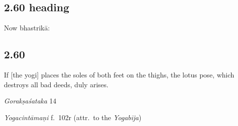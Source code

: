 \begin{ekdosis}
\subsection*{2.60 heading}
\begin{translation}[hp02_060a]
Now bhastrikā:
\end{translation}


\subsection*{2.60}
\begin{translation}[hp02_060]
If [the yogi] places the soles of both feet on the thighs, the lotus pose, which destroys all bad deeds, duly arises.
\end{translation}

\begin{sources}[hp02_060]
\emph{Gorakṣaśataka} 14

\begin{versinnote}
\end{versinnote}
\end{sources}

\begin{testimonia}[hp02_060]

\emph{Yogacintāmaṇi} f.~102r (attr.~to the \emph{Yogabīja})

\begin{versinnote}
\end{versinnote}


\end{testimonia}
\end{ekdosis}
